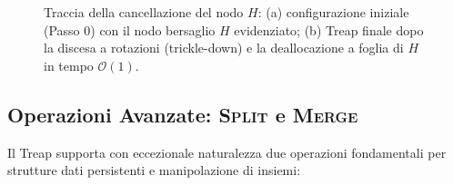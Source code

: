\begin{figure}[htbp]
{%
}
\caption{Traccia della cancellazione del nodo $H$: (a) configurazione iniziale (Passo 0) con il nodo bersaglio $H$ evidenziato; (b) Treap finale dopo la discesa a rotazioni (trickle-down) e la deallocazione a foglia di $H$ in tempo $\mathcal{O}(1)$.}
\label{fig:treap-delete-trace}
\end{figure}

\FloatBarrier
\subsection{Operazioni Avanzate: \textsc{Split} e \textsc{Merge}}
Il Treap supporta con eccezionale naturalezza due operazioni fondamentali per strutture dati persistenti e manipolazione di insiemi:

